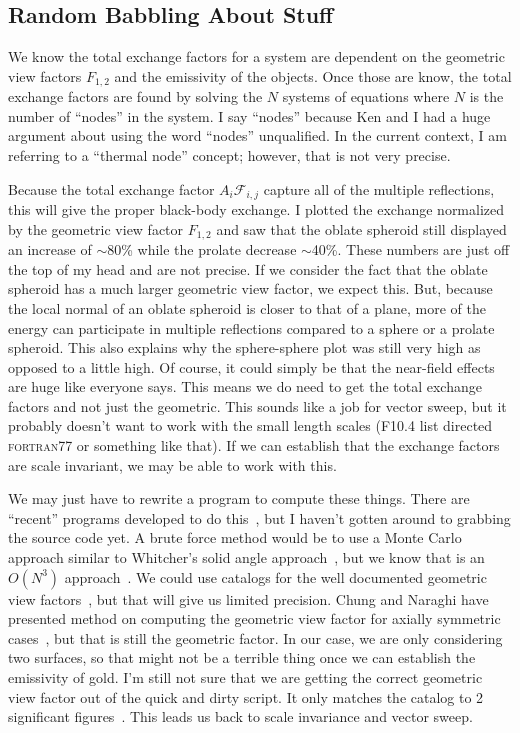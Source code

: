 \subsection{Random Babbling About Stuff}
We know the total exchange factors for a system are dependent on the
geometric view factors \(F_{1,2}\) and the emissivity of the objects.
Once those are know, the total exchange factors are found by solving the
\(N\) systems of equations where \(N\) is the number of ``nodes'' in the
system.  I say ``nodes'' because Ken and I had a huge argument about
using the word ``nodes'' unqualified.  In the current context, I am
referring to a ``thermal node'' concept; however, that is not very
precise. 

Because the total exchange factor \(A_i\mathcal{F}_{i,j}\) capture all
of the multiple reflections, this will give the proper black-body
exchange.  I plotted the exchange normalized by the geometric view
factor \(F_{1,2}\) and saw that the oblate spheroid still displayed an
increase of \(\sim\)80\% while the prolate decrease \(\sim\)40\%.  These
numbers are just off the top of my head and are not precise.  If we
consider the fact that the oblate spheroid has a much larger geometric
view factor, we expect this.  But, because the local normal of an oblate
spheroid is closer to that of a plane, more of the energy can
participate in multiple reflections compared to a sphere or a prolate
spheroid.  This also explains why the sphere-sphere plot was still very
high as opposed to a little high.  Of course, it could simply be that
the near-field effects are huge like everyone says.  This means we do
need to get the total exchange factors and not just the geometric.  This
sounds like a job for vector sweep, but it probably doesn't want to work
with the small length scales (\textsc{F10.4} list directed
\textsc{fortran77} or something like that).  If we can establish that
the exchange factors are scale invariant, we may be able to work with
this.

We may just have to rewrite a program to compute these things.  There
are ``recent'' programs developed to do
this~\cite{walton_calculation_2002}, but I haven't gotten around to
grabbing the source code yet.  A brute force method would be to use a
Monte Carlo approach similar to Whitcher's solid angle
approach~\cite{whitcher_monte_2012}, but we know that is an \(O(N^3)\)
approach~\cite{walton_calculation_2002}.  We could use catalogs for the
well documented geometric view factors~\cite{howell_catalog_2010}, but
that will give us limited precision.  Chung and Naraghi have presented
method on computing the geometric view factor for axially symmetric
cases~\cite{chung_simpler_1982, naraghi_radiation_1982,
chung_formulation_1984}, but that is still the geometric factor.  In our
case, we are only considering two surfaces, so that might not be a
terrible thing once we can establish the emissivity of gold.  I'm still
not sure that we are getting the correct geometric view factor out of
the quick and dirty script.  It only matches the catalog to 2
significant figures~\cite{howell_catalog_2010}.  This leads us back to
scale invariance and vector sweep.


